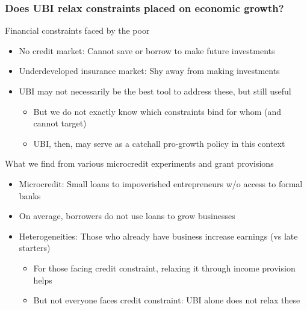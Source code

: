 \documentclass[aspectratio=169]{beamer}
\begin{document}
\begin{frame}
\frametitle{Does UBI relax constraints placed on economic growth?} 
Financial constraints faced by the poor
\begin{itemize}\setlength\itemsep{3pt}
\item No credit market: Cannot save or borrow to make future investments
\item Underdeveloped insurance market: Shy away from making investments
\item UBI may not necessarily be the best tool to address these, but still useful
\begin{itemize}\setlength\itemsep{3pt}
\item But we do not exactly know which constraints bind for whom (and cannot target)
\item UBI, then, may serve as a catchall pro-growth policy in this context
\end{itemize}
\end{itemize}\medskip
What we find from various microcredit experiments and grant provisions
\begin{itemize}\setlength\itemsep{3pt}
\item Microcredit: Small loans to impoverished entrepreneurs w/o access to formal banks
\item On average, borrowers do not use loans to grow businesses
\item Heterogeneities: Those who already have business increase earnings (vs late starters)
\begin{itemize}\setlength\itemsep{3pt}
\item For those facing credit constraint, relaxing it through income provision helps
\item But not everyone faces credit constraint: UBI alone does not relax these
\end{itemize}
\end{itemize}
\end{frame}
\end{document}
